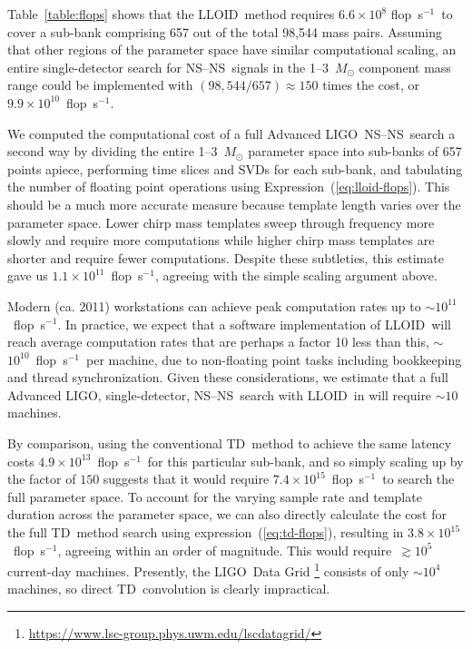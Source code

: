 \documentclass[preprint2]{aastex}
\newcommand{\NS}{NS}
\newcommand{\LIGO}{LIGO}%
\newcommand{\flops}{flop~s$^{-1}$}
\newcommand{\lloid}{LLOID}%
\newcommand{\TD}{TD}%
\begin{document}
Table~\ref{table:flops} shows that the \lloid\ method requires $6.6 \times 10^8$
\flops\ to cover a sub-bank comprising 657 out of the total 98,544 mass pairs.
Assuming that other regions of the parameter space have similar computational
scaling, an entire single-detector search for \NS--\NS\ signals in the
1--3~$M_\odot$ component mass range could be implemented with $(98,544/657)\approx150$ times the cost, or $9.9 \times 10^{10}$~\flops.

We computed the computational cost of a full Advanced \LIGO\ \NS--\NS\ search a
second way by dividing the entire 1--3~$M_\odot$ parameter space into sub-banks
of 657 points apiece, performing time slices and SVDs for each sub-bank, and
tabulating the number of floating point operations using
Expression~(\ref{eq:lloid-flops}).  This should be a much more accurate measure
because template length varies over the parameter space.  Lower chirp mass
templates sweep through frequency more slowly and require more computations
while higher chirp mass templates are shorter and require fewer computations.
Despite these subtleties, this estimate gave us $1.1 \times 10^{11}$~\flops,
agreeing with the simple scaling argument above.

Modern (ca. 2011) workstations can achieve peak
computation rates up to $\sim$$10^{11}$~\flops.  In practice, we expect that a
software implementation of \lloid\ will reach average computation rates that are
perhaps a factor 10 less than this, $\sim$$10^{10}$~\flops\ per machine, due to
non-floating point tasks including bookkeeping and thread synchronization.
Given these considerations, we estimate that a full Advanced
\LIGO, single-detector, \NS--\NS\ search with \lloid\ in will require $\sim$$10$ machines.

By comparison, using the conventional \TD\ method to achieve the same latency costs
$4.9 \times 10^{13}$~\flops\ for this particular sub-bank, and so simply scaling up by the factor of $150$ suggests that it would require $7.4 \times 10^{15}$~\flops\
to search the full parameter space.  To account for the varying sample rate and template duration across the parameter space, we can also directly calculate the cost for the full \TD\ method search using expression~(\ref{eq:td-flops}), resulting in $3.8 \times 10^{15}$~\flops, agreeing within an order of magnitude.  This would require~$\gtrsim$$10^5$ current-day machines.  Presently, the \LIGO\ Data Grid%
\footnote{\url{https://www.lsc-group.phys.uwm.edu/lscdatagrid/}} consists of
only $\sim$$10^4$ machines, so direct \TD\ convolution is clearly impractical.
\end{document}
